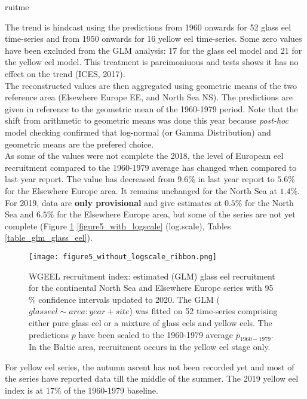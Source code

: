 ruitme\documentclass[pdftex,11pt,a4paper]{report}
\begin{document}
The trend is hindcast using the predictions from 1960 onwards for
52 glass eel time-series and from 1950 onwards for
16 yellow eel time-series.
Some zero values have been excluded from the GLM analysis: 
17 for the glass eel model and
21 for the yellow eel model. This
treatment is parcimoniuous and tests shows it has no effect on the trend (ICES,
2017).\\

The reconstructed values are then aggregated using geometric means of the two
reference area (Elsewhere Europe EE, and North Sea NS). The predictions are given 
in reference to the geometric mean of the 1960-1979 period.
Note that the shift from arithmetic to geometric means was done this year
because \textit{post-hoc} model checking confirmed that log-normal (or Gamma
Distribution) and geometric means are the prefered choice. \\

As some of the values were not complete the 2018, the
level of European eel recruitment compared to the 1960-1979 average has changed 
when compared to last year report. The value has decreased from 9.6\% in last
year report to $5.6$\% for the Elsewhere Europe area.  It remains unchanged 
 for the North Sea at $1.4$\%.
 For 2019, data are \textbf{only provisional} and give estimates at
 $0.5$\% for the North Sea and $6.5$\% for the
Elsewhere Europe area, but some of the series are not yet complete (Figure
\ref{figure5} \ref{figure5_with_logscale} (log.scale), Tables \ref{table_glm_glass_eel}).

\begin{figure}[H]
\centering
\texttt{[image: figure5\_without\_logscale\_ribbon.png]}
\caption{WGEEL recruitment index: estimated (GLM) glass eel
recruitment for the continental North Sea and Elsewhere Europe series with 95 \%
confidence intervals updated to 2020.
  The  GLM ($glass eel \sim area:year+site$)  was  fitted  on
  52 time-series comprising either pure glass eel or a mixture of 
  glass eels and yellow eels. The predictions $p$ have been scaled to the 1960-1979
  average $\bar{p}_{1960-1979}$. In the Baltic area, recruitment occurs in the yellow eel stage only.}
\label{figure5}
\end{figure}

For yellow eel series, the autumn ascent has not been recorded yet and most of
the series have reported data till the middle of the summer. The 2019 yellow eel
index is at $17$\% of
the 1960-1979 baseline. 
\end{document}
